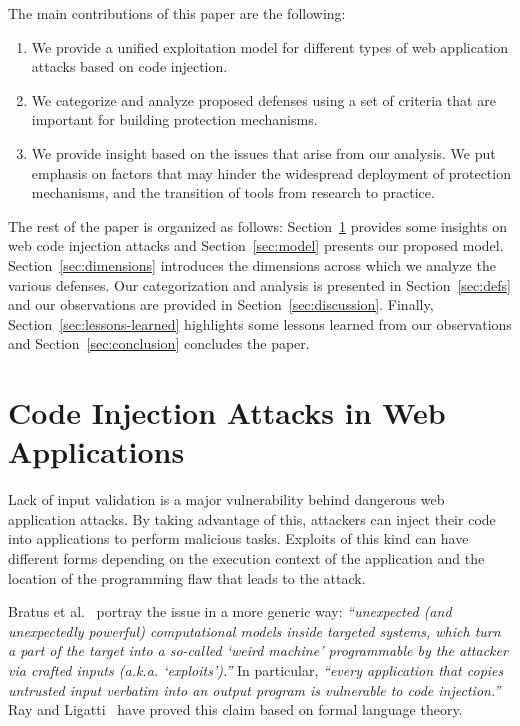 \documentclass[10pt,journal,compsoc]{IEEEtran}
\begin{document}
The main contributions of this paper are the following:

\begin{enumerate}
\item We provide a unified exploitation model for different types of
  web application attacks based on code injection.
\item We categorize and analyze proposed defenses using a set of
  criteria that are important for building protection mechanisms.
\item We provide insight based on the issues that arise from our analysis.
  We put emphasis on factors that may hinder the widespread deployment of
  protection mechanisms, and the transition of tools from research to practice.
\end{enumerate}
\vspace{-0.5mm}

The rest of the paper is organized as follows:
Section~\ref{sec:attacks} provides some insights on
web code injection attacks and
Section~\ref{sec:model} presents our proposed model.
Section~\ref{sec:dimensions} introduces the dimensions
across which we analyze the various defenses.
Our categorization and analysis is presented in
Section~\ref{sec:defs} and our observations are
provided in Section~\ref{sec:discussion}.
Finally, Section~\ref{sec:lessons-learned}
highlights some lessons learned from our observations
and Section~\ref{sec:conclusion} concludes the paper.

\section{Code Injection Attacks in Web Applications}
\label{sec:attacks}

Lack of input validation is a major vulnerability behind dangerous web
application attacks. By taking advantage of this, attackers can inject
their code into applications to perform malicious tasks. Exploits of
this kind can have different forms depending on the execution context
of the application and the location of the programming flaw that leads
to the attack.

Bratus et al.~\cite{BLSPS11} portray the issue in a more generic way:
{\it ``unexpected (and unexpectedly powerful) computational models
  inside targeted systems, which turn a part of the target into a
  so-called `weird machine' programmable by the attacker via crafted
  inputs (a.k.a. `exploits').''} In particular, {\it ``every
  application that copies untrusted input verbatim into an output
  program is vulnerable to code injection.''} Ray and
Ligatti~\cite{RL12b} have proved this claim based on formal language
theory.
\end{document}
